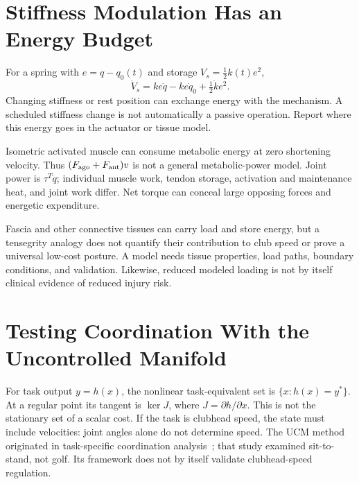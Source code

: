 \section{Stiffness Modulation Has an Energy Budget}
\label{sec:overconstraint_costs}

For a spring with $e=q-q_0(t)$ and storage $V_s=\tfrac12k(t)e^2$,
\begin{equation}
\dot V_s=ke\dot q-ke\dot q_0+\tfrac12\dot k e^2.
\end{equation}
Changing stiffness or rest position can exchange energy with the mechanism.
A scheduled stiffness change is not automatically a passive operation. Report
where this energy goes in the actuator or tissue model.

Isometric activated muscle can consume metabolic energy at zero shortening
velocity. Thus $(F_{\rm ago}+F_{\rm ant})v$ is not a general metabolic-power
model. Joint power is $\tau^T\dot q$; individual muscle work, tendon storage,
activation and maintenance heat, and joint work differ. Net torque can conceal
large opposing forces and energetic expenditure.

Fascia and other connective tissues can carry load and store energy, but a
tensegrity analogy does not quantify their contribution to club speed or prove
a universal low-cost posture. A model needs tissue properties, load paths,
boundary conditions, and validation. Likewise, reduced modeled loading is not
by itself clinical evidence of reduced injury risk.

\section{Testing Coordination With the Uncontrolled Manifold}
\label{sec:experimental_evidence}

For task output $y=h(x)$, the nonlinear task-equivalent set is
$\{x:h(x)=y^*\}$. At a regular point its tangent is $\ker J$, where
$J=\partial h/\partial x$. This is not the stationary set of a scalar cost.
If the task is clubhead speed, the state must include velocities: joint angles
alone do not determine speed. The UCM method originated in task-specific
coordination analysis~\cite{Scholz1999}; that study examined sit-to-stand, not golf.
Its framework does not by itself validate clubhead-speed regulation.

